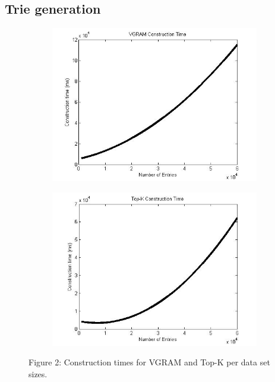 \documentclass[pdftex,12pt,letter]{article}
\begin{document}
\subsection{Trie generation}
\begin{figure}[h!]
\centering
\begin{subfigure}[b]{0.45\textwidth}
\includegraphics[width=\textwidth]{VGRAMconstructionTime.jpg}
\label{fig:vgram}
\end{subfigure}
\begin{subfigure}[b]{0.45\textwidth}
\includegraphics[width=\textwidth]{TOPKconstructionTime.jpg}
\label{fig:topk}
\end{subfigure}
\begin{center}
Figure 2: Construction times for VGRAM and Top-K per data set sizes.
\end{center}
\end{figure}
\end{document}
